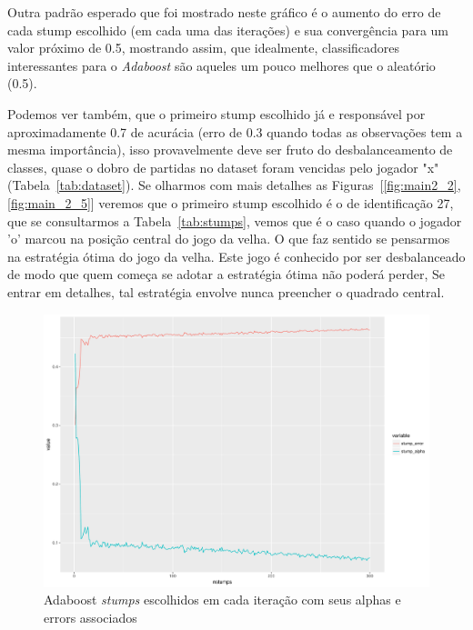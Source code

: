 Outra padrão esperado que foi mostrado neste gráfico é o aumento do erro de cada stump escolhido (em cada uma das iterações) e sua convergência para um valor próximo de 0.5, mostrando assim, que idealmente, classificadores interessantes para o \emph{Adaboost} são aqueles um pouco melhores que o aleatório (0.5). 

Podemos ver também, que o primeiro stump escolhido já e responsável por aproximadamente 0.7 de acurácia (erro de 0.3 quando todas as observações tem a mesma importância), isso provavelmente deve ser fruto do desbalanceamento de classes, quase o dobro de partidas no dataset foram vencidas pelo jogador "x" (Tabela~\ref{tab:dataset}). Se olharmos com mais detalhes as Figuras~[\ref{fig:main2_2},\ref{fig:main_2_5}] veremos que o primeiro stump escolhido é o de identificação 27, que se consultarmos a Tabela~\ref{tab:stumps}, vemos que é o caso quando o jogador 'o' marcou na posição central do jogo da velha. O que faz sentido se pensarmos na estratégia ótima do jogo da velha. Este jogo é conhecido por ser desbalanceado de modo que quem começa se adotar a estratégia ótima não poderá perder, Se entrar em detalhes, tal estratégia envolve nunca preencher o quadrado central. 

\begin{figure}[h]
  \includegraphics[width=\linewidth]{imgs/alpha_error.pdf}
  \caption{Adaboost \emph{stumps} escolhidos em cada iteração com seus  alphas e errors  associados}
  \label{fig:adaboost_alphas}
\end{figure}

